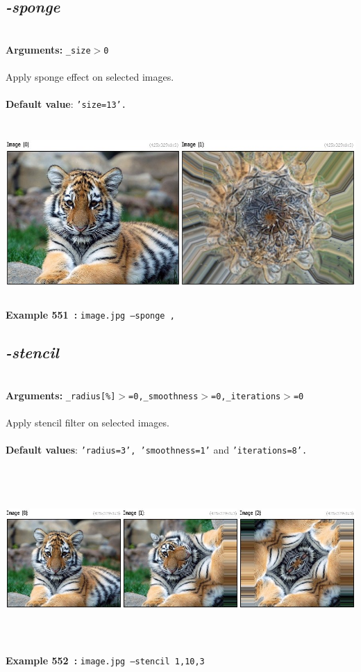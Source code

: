 \documentclass[a4paper,11pt,twoside]{book}
\begin{document}
\subsection{\emph{-sponge} }\vspace*{-0.5em}
~\\\textbf{Arguments: } 
{\small \texttt{\_size$>$0}}\\~\\
Apply sponge effect on selected images.
~\\~\\\textbf{Default value}: {\small \texttt{'size=13'.}}
\begin{center}\includegraphics[keepaspectratio=true,height=7cm,width=\textwidth]{img/gmic_def551.jpg}\\
{\footnotesize \textbf{Example 551~:} \texttt{image.jpg --sponge ,}}
\end{center}

\subsection{\emph{-stencil} }\vspace*{-0.5em}
~\\\textbf{Arguments: } 
{\small \texttt{\_radius[\%]$>$=0,\_smoothness$>$=0,\_iterations$>$=0}}\\~\\
Apply stencil filter on selected images.
~\\~\\\textbf{Default values}: {\small \texttt{'radius=3', 'smoothness=1'} and \texttt{'iterations=8'.}}
\begin{center}\includegraphics[keepaspectratio=true,height=7cm,width=\textwidth]{img/gmic_def552.jpg}\\
{\footnotesize \textbf{Example 552~:} \texttt{image.jpg --stencil 1,10,3}}
\end{center}
\end{document}
